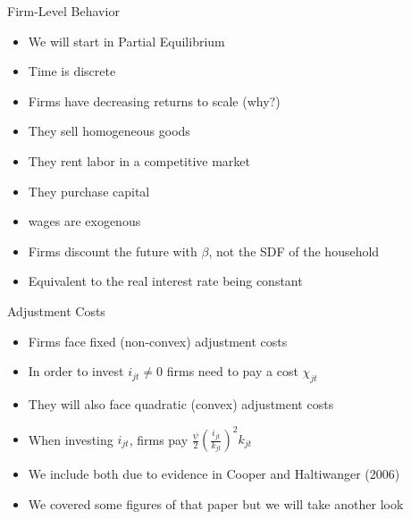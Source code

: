 \documentclass[11pt,aspectratio=169,xcolor={dvipsnames},hyperref={pdftex,pdfpagemode=UseNone,hidelinks,pdfdisplaydoctitle=true},usepdftitle=false]{beamer}
\begin{document}
\begin{frame}{Firm-Level Behavior}
\begin{itemize}
\item We will start in Partial Equilibrium
\pause
\item Time is discrete
\pause
\item Firms have decreasing returns to scale (why?)
\pause
\item They sell homogeneous goods
\pause
\item They rent labor in a competitive market
\pause
\item They purchase capital
\pause
\item wages are exogenous
\pause
\item Firms discount the future with $\beta$, not the SDF of the household
\pause
\item Equivalent to the real interest rate being constant
\end{itemize}
\end{frame}

\begin{frame}{Adjustment Costs}
\begin{itemize}
\item Firms face fixed (non-convex) adjustment costs
\pause
\item In order to invest $i_{jt} \neq 0$ firms need to pay a cost $\chi_{jt}$
\item They will also face quadratic (convex) adjustment costs
\pause
\item When investing $i_{jt}$, firms pay $\frac{\psi}{2}\left(\frac{i_{jt}}{k_{jt}}\right)^2 k_{jt}$
\pause
\item We include both due to evidence in Cooper and Haltiwanger (2006)
\pause
\item We covered some figures of that paper but we will take another look
\end{itemize}
\end{frame}
\end{document}
